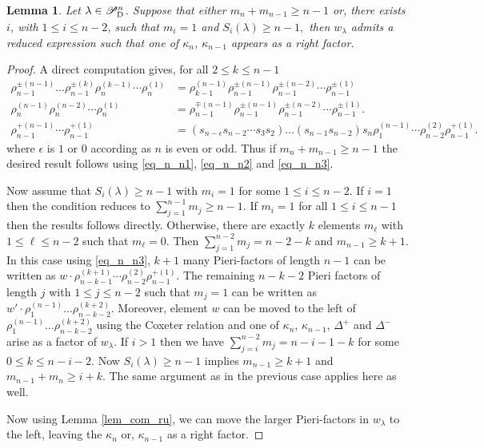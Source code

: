 \documentclass[a4paper]{amsart}
\newtheorem{lem}[thm]{Lemma}
\theoremstyle{remark}
\numberwithin{equation}{section}
\begin{document}
\begin{lem}\label{lem_m_n_m_n1}
  Let $\lambda\in\mathscr{P}^n_{\mathrm{D}_{}}$. Suppose that either  $m_n+m_{n-1}\ge n-1$ or, there exists $i$, with $1\leq i\leq n-2$,   such that $m_i=1$ and  $S_i(\lambda)\geq n-1,$ then $w_\lambda$ admits a reduced expression such that one of $\kappa_n$, $\kappa_{n-1}$ appears as a right factor.
\end{lem}
\begin{proof}
 A direct computation gives, for all $2\le k\le n-1 $
\begin{align}
    \rho_{n-1}^{\pm(n-1)}\dots \rho_{n-1}^{\pm(k)}\rho_n^{(k-1)}\cdots \rho_n^{(1)}&=\rho_{k-1}^{(n-1)}\rho_{n-1}^{\pm(n-1)}\rho_{n-1}^{\pm(n-2)}\cdots \rho_{n-1}^{\pm(1)}\label{eq_n_n1}\\ 
  \rho_{n}^{(n-1)}\rho_n^{(n-2)}\cdots \rho_n^{(1)}&=\rho_{n-1}^{\mp(n-1)}\rho_{n-1}^{\pm(n-1)}\rho_{n-1}^{\pm(n-2)}\cdots \rho_{n-1}^{\pm(1)} \label{eq_n_n2}.\\  
\rho_{n-1}^{+(n-1)}\cdots\rho_{n-1}^{+(1)}&=(s_{n-\epsilon}s_{n-2}\cdots s_3s_2)\dots(s_{n-1}s_{n-2})s_{n}\rho_1^{(n-1)}\cdots\rho_{n-2}^{(2)}\rho_{n-1}^{+(1)}\label{eq_n_n3}.
\end{align}
where $\epsilon$ is $1$ or $0$ according as $n$ is even or odd. Thus if $m_n+m_{n-1}\geq n-1$ the desired result follows using \eqref{eq_n_n1}, \eqref{eq_n_n2} and \eqref{eq_n_n3}.



Now assume that $S_i(\lambda)\geq n-1$ with $m_i=1$ for some $1\leq i\le n-2$. If $i=1$ then the condition reduces to $\sum_{j=1}^{n-1}m_j\geq n-1$. If $m_i=1$ for all $1\leq i\le n-1$ then the results follows directly. Otherwise, there are exactly $k$ elements $m_\ell$ with $1\leq \ell\le n-2$ such that $m_\ell=0$. Then $\sum_{j=1}^{n-2}m_j= n-2-k$ and $m_{n-1}\ge k+1$. In this case using \eqref{eq_n_n3}, $k+1$ many Pieri-factors of length $n-1$ can be written as $w{\cdot}\rho_{n-k-1}^{(k+1)}\cdots\rho_{n-2}^{(2)}\rho_{n-1}^{+(1)}$. The remaining $n-k-2$ Pieri factors of length $j$ with $1\leq j \le n-2$ such that $m_j=1$ can be written as $w'{\cdot}\rho_1^{(n-1)}\dots\rho_{n-k-2}^{(k+2)}$. Moreover, element $w$ can be moved to the left of $\rho_1^{(n-1)}\dots\rho_{n-k-2}^{(k+2)}$ using the Coxeter relation and one of $\kappa_n$, $\kappa_{n-1}$, $\Delta^+$ and $\Delta^-$ arise as a factor of $w_\lambda$.
If $i>1$ then we have $\sum_{j=i}^{n-2}m_j=n-i-1-k$ for some $0\le k\le n-i-2$. Now $S_i(\lambda)\ge n-1$ implies $m_{n-1}\ge k+1$ and $m_{n-1}+m_n\ge i+k$. The same argument as in the previous case applies here as well. 

Now using Lemma \ref{lem_com_ru}, we can move the larger Pieri-factors in $w_\lambda$ to the left, leaving the $\kappa_n$ or, $\kappa_{n-1}$ as a right factor.
\end{proof}
\end{document}
